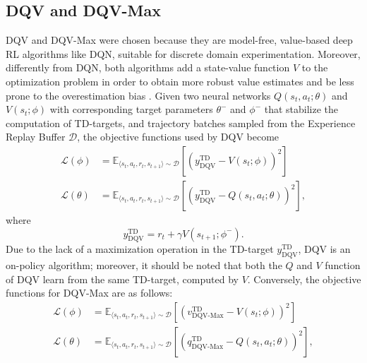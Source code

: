 \subsection{DQV and DQV-Max}
DQV and DQV-Max were chosen because they are model-free, value-based
deep RL algorithms like DQN, suitable for discrete domain
experimentation. Moreover, differently from DQN, both algorithms add
a state-value function $V$ to the optimization problem in order to
obtain more robust value estimates and be less prone to the
overestimation bias \citep{sabatelli2020deep}. Given two neural
networks $Q\left(s_t,a_t;\theta\right)$ and $V\left(s_t;\phi\right)$
with corresponding target parameters $\theta^-$ and $\phi^-$ that
stabilize the computation of TD-targets, and trajectory batches
sampled from the Experience Replay Buffer $\mathcal{D}$, the objective
functions used by DQV become
\begin{align}
\mathcal{L}\left(\phi\right)&=\mathbb{E}_{\langle
                              s_t,a_t,r_t,s_{t+1}\rangle\sim
                              \mathcal{D}}\left[{\left(y^{\scriptscriptstyle
                              \textrm{TD}}_{\scriptscriptstyle
                              \textrm{DQV}}-V\left(s_t;\phi\right)\right)}^2\right]\label{eq:dqv_loss_0}
  \\
\mathcal{L}\left(\theta\right)&=\mathbb{E}_{\langle
                                s_t,a_t,r_t,s_{t+1}\rangle\sim
                                \mathcal{D}}\left[{\left(y^{\scriptscriptstyle
                                \textrm{TD}}_{\scriptscriptstyle
                                \textrm{DQV}}-Q\left(s_t,a_t;\theta\right)\right)}^2\right],\label{eq:dqv_loss_1}
\end{align}
where
\begin{equation}
  y^{\scriptscriptstyle \textrm{TD}}_{\scriptscriptstyle
    \textrm{DQV}}=r_t+\gamma V\left(s_{t+1};\phi^{-}\right).
\end{equation}
Due to the lack of a maximization operation in the TD-target
$y^{\scriptscriptstyle \textrm{TD}}_{\scriptscriptstyle
  \textrm{DQV}}$, DQV is an on-policy algorithm; moreover, it should
be noted that both the $Q$ and $V$ function of DQV learn from the same
TD-target, computed by $V$. Conversely, the objective functions for
DQV-Max are as follows:
\begin{align}
\mathcal{L}\left(\phi\right)&=\mathbb{E}_{\langle
                              s_t,a_t,r_t,s_{t+1}\rangle\sim
                              \mathcal{D}}\left[{\left(v^{\scriptscriptstyle
                              \textrm{TD}}_{\scriptscriptstyle
                              \textrm{DQV-Max}}-V\left(s_t;\phi\right)\right)}^2\right]
  \\
\mathcal{L}\left(\theta\right)&=\mathbb{E}_{\langle
                                s_t,a_t,r_t,s_{t+1}\rangle\sim
                                \mathcal{D}}\left[{\left(q^{\scriptscriptstyle
                                \textrm{TD}}_{\scriptscriptstyle
                                \textrm{DQV-Max}}-Q\left(s_t,a_t;\theta\right)\right)}^2\right],
\end{align}
